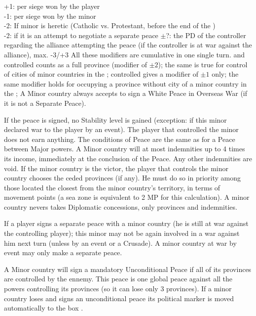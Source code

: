 +1:	per siege won by the player \\
-1:	per siege won by the minor \\
-2: If minor is heretic (Catholic vs. Protestant, before the end of
the ) \\
-2: if it is an attempt to negotiate a separate peace $\pm$?: the PD of the
controller regarding the alliance attempting the peace (if the controller is
at war against the alliance), max. -3/+3
\bparag
All these modifiers are cumulative in one single turn.
\bparag \COL and \TP\faceplus controlled counts as a full province (modifier
of $\pm 2$); the same is true for control of cities of minor countries in the
\ROTW;
\bparag \TP\facemoins controlled gives a modifier of $\pm 1$ only; the same
modifier holds for occupying a province without city of a minor country in the
\ROTW;
\bparag A Minor country always accepts to sign a White Peace in Overseas War
(if it is not a Separate Peace).

If the peace is signed, no Stability level is gained (exception: if this minor
declared war to the player by an event). The player that controlled the minor
does not earn anything.
\bparag The conditions of Peace are the same as for a Peace between Major
powers.
\bparag A Minor country will at most indemnities up to 4 times its income,
immediately at the conclusion of the Peace. Any other indemnities are void.
\bparag If the minor country is the victor, the player that controls the minor
country chooses the ceded provinces (if any). He must do so in priority among
those located the closest from the minor country's territory, in terms of
movement points (a sea zone is equivalent to 2 MP for this calculation).
\bparag A minor country nevers takes Diplomatic concessions, only provinces
and indemnities.

If a player signs a separate peace with a minor country (he is still at war
against the controlling player); this minor may not be again involved in a war
against him next turn (unless by an event or a Crusade).
\bparag A minor country at war by event may only make a separate peace.

A Minor country will sign a mandatory Unconditional Peace if all of its
provinces are controlled by the ennemy. This peace is one global peace against
all the powers controlling its provinces (so it can lose only 3 provinces).
\bparag If a minor country loses and signs an unconditional peace its
political marker is moved automatically to the box \Neutral.

